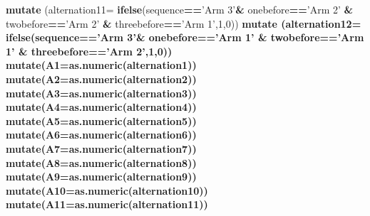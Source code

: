 \documentclass[]{article}
\newenvironment{Shaded}{\begin{snugshade}}{\end{snugshade}}
\newcommand{\DataTypeTok}[1]{\textcolor[rgb]{0.13,0.29,0.53}{#1}}
\newcommand{\DecValTok}[1]{\textcolor[rgb]{0.00,0.00,0.81}{#1}}
\newcommand{\KeywordTok}[1]{\textcolor[rgb]{0.13,0.29,0.53}{\textbf{#1}}}
\newcommand{\NormalTok}[1]{#1}
\newcommand{\OperatorTok}[1]{\textcolor[rgb]{0.81,0.36,0.00}{\textbf{#1}}}
\newcommand{\StringTok}[1]{\textcolor[rgb]{0.31,0.60,0.02}{#1}}
\begin{document}
\begin{Shaded}
\begin{Highlighting}[]
{{{{{{{{{{{{\StringTok{    }\KeywordTok{mutate}\NormalTok{ (}\DataTypeTok{alternation11=} \KeywordTok{ifelse}\NormalTok{(sequence}\OperatorTok{==}\StringTok{'Arm 3'}\OperatorTok{&}\StringTok{ }\NormalTok{onebefore}\OperatorTok{==}\StringTok{'Arm 2'} \OperatorTok{&}\StringTok{ }\NormalTok{twobefore}\OperatorTok{==}\StringTok{'Arm 2'} \OperatorTok{&}\StringTok{ }\NormalTok{threebefore}\OperatorTok{==}\StringTok{'Arm 1'}\NormalTok{,}\DecValTok{1}\NormalTok{,}\DecValTok{0}\NormalTok{)) }\OperatorTok{%>%}\StringTok{ }
\StringTok{    }\KeywordTok{mutate}\NormalTok{ (}\DataTypeTok{alternation12=} \KeywordTok{ifelse}\NormalTok{(sequence}\OperatorTok{==}\StringTok{'Arm 3'}\OperatorTok{&}\StringTok{ }\NormalTok{onebefore}\OperatorTok{==}\StringTok{'Arm 1'} \OperatorTok{&}\StringTok{ }\NormalTok{twobefore}\OperatorTok{==}\StringTok{'Arm 1'} \OperatorTok{&}\StringTok{ }\NormalTok{threebefore}\OperatorTok{==}\StringTok{'Arm 2'}\NormalTok{,}\DecValTok{1}\NormalTok{,}\DecValTok{0}\NormalTok{)) }\OperatorTok{%>%}\StringTok{   }
\StringTok{    }
\StringTok{    }\KeywordTok{mutate}\NormalTok{(}\DataTypeTok{A1=}\KeywordTok{as.numeric}\NormalTok{(alternation1)) }\OperatorTok{%>%}\StringTok{ }
\StringTok{    }\KeywordTok{mutate}\NormalTok{(}\DataTypeTok{A2=}\KeywordTok{as.numeric}\NormalTok{(alternation2)) }\OperatorTok{%>%}\StringTok{ }
\StringTok{    }\KeywordTok{mutate}\NormalTok{(}\DataTypeTok{A3=}\KeywordTok{as.numeric}\NormalTok{(alternation3)) }\OperatorTok{%>%}\StringTok{ }
\StringTok{    }\KeywordTok{mutate}\NormalTok{(}\DataTypeTok{A4=}\KeywordTok{as.numeric}\NormalTok{(alternation4)) }\OperatorTok{%>%}\StringTok{ }
\StringTok{    }\KeywordTok{mutate}\NormalTok{(}\DataTypeTok{A5=}\KeywordTok{as.numeric}\NormalTok{(alternation5)) }\OperatorTok{%>%}\StringTok{ }
\StringTok{    }\KeywordTok{mutate}\NormalTok{(}\DataTypeTok{A6=}\KeywordTok{as.numeric}\NormalTok{(alternation6)) }\OperatorTok{%>%}\StringTok{ }
\StringTok{    }\KeywordTok{mutate}\NormalTok{(}\DataTypeTok{A7=}\KeywordTok{as.numeric}\NormalTok{(alternation7)) }\OperatorTok{%>%}\StringTok{ }
\StringTok{    }\KeywordTok{mutate}\NormalTok{(}\DataTypeTok{A8=}\KeywordTok{as.numeric}\NormalTok{(alternation8)) }\OperatorTok{%>%}\StringTok{ }
\StringTok{    }\KeywordTok{mutate}\NormalTok{(}\DataTypeTok{A9=}\KeywordTok{as.numeric}\NormalTok{(alternation9)) }\OperatorTok{%>%}\StringTok{ }
\StringTok{    }\KeywordTok{mutate}\NormalTok{(}\DataTypeTok{A10=}\KeywordTok{as.numeric}\NormalTok{(alternation10)) }\OperatorTok{%>%}\StringTok{ }
\StringTok{    }\KeywordTok{mutate}\NormalTok{(}\DataTypeTok{A11=}\KeywordTok{as.numeric}\NormalTok{(alternation11)) }\OperatorTok{%>%}\StringTok{ }
}}}}}}}}}}}}}}}}}}}}}}}}}
\end{Highlighting}
\end{Shaded}
\end{document}
